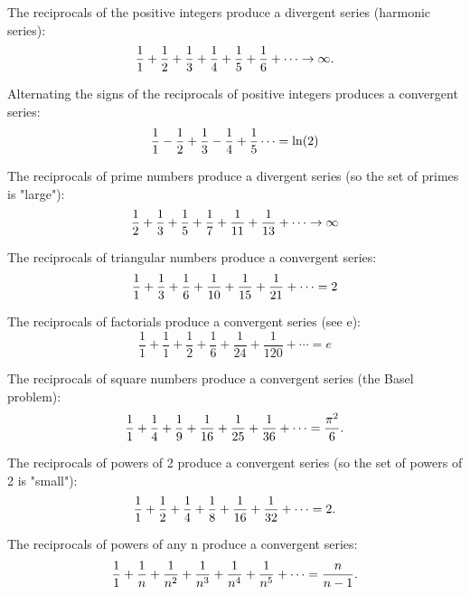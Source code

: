 \documentclass[UTF8, a4paper, 11pt, onecolumn]{article}
\begin{document}
The reciprocals of the positive integers produce a divergent series (harmonic series):
\begin{equation*}
  {1 \over 1}+{1 \over 2}+{1 \over 3}+{1 \over 4}+{1 \over 5}+{1 \over 6}+\cdots \rightarrow \infty .
\end{equation*}

Alternating the signs of the reciprocals of positive integers produces a convergent series:
\begin{equation*}
  {1 \over 1}-{1 \over 2}+{1 \over 3}-{1 \over 4}+{1 \over 5}\cdots =\ln(2)
\end{equation*}

The reciprocals of prime numbers produce a divergent series (so the set of primes is "large"):
\begin{equation*}
  {1 \over 2}+{1 \over 3}+{1 \over 5}+{1 \over 7}+{1 \over 11}+{1 \over 13}+\cdots \rightarrow \infty
\end{equation*}

The reciprocals of triangular numbers produce a convergent series:
\begin{equation*}
  {1 \over 1}+{1 \over 3}+{1 \over 6}+{1 \over 10}+{1 \over 15}+{1 \over 21}+\cdots =2
\end{equation*}

The reciprocals of factorials produce a convergent series (see e):
\begin{equation*}
  {\frac {1}{1}}+{\frac {1}{1}}+{\frac {1}{2}}+{\frac {1}{6}}+{\frac {1}{24}}+{\frac {1}{120}}+\cdots =e
\end{equation*}

The reciprocals of square numbers produce a convergent series (the Basel problem):
\begin{equation*}
  {1 \over 1}+{1 \over 4}+{1 \over 9}+{1 \over 16}+{1 \over 25}+{1 \over 36}+\cdots ={\pi ^{2} \over 6}.
\end{equation*}

The reciprocals of powers of 2 produce a convergent series (so the set of powers of 2 is "small"):
\begin{equation*}
  {1 \over 1}+{1 \over 2}+{1 \over 4}+{1 \over 8}+{1 \over 16}+{1 \over 32}+\cdots =2.
\end{equation*}

The reciprocals of powers of any n produce a convergent series:
\begin{equation*}
  {\displaystyle {1 \over 1}+{1 \over n}+{1 \over n^{2}}+{1 \over n^{3}}+{1 \over n^{4}}+{1 \over n^{5}}+\cdots ={n \over n-1}.}
\end{equation*}
\end{document}
